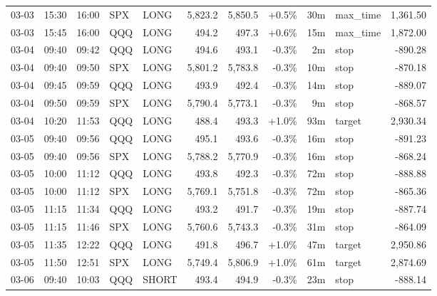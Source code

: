 \documentclass[11pt,a4paper,twoside]{article}
\begin{document}
\begin{center}
\begin{longtable}{>{\color{txtmain}}l l l l l r r r r >{\color{txtmain}}l r}
03-03 & 15:30 & 16:00 & SPX & LONG & 5,823.2 & 5,850.5 & \textcolor{wingreen}{+0.5\%} & 30m & max\_time & \textcolor{wingreen}{1,361.50} \\
03-03 & 15:45 & 16:00 & QQQ & LONG & 494.2 & 497.3 & \textcolor{wingreen}{+0.6\%} & 15m & max\_time & \textcolor{wingreen}{1,872.00} \\
03-04 & 09:40 & 09:42 & QQQ & LONG & 494.6 & 493.1 & \textcolor{lossred}{-0.3\%} & 2m & stop & \textcolor{lossred}{-890.28} \\
03-04 & 09:40 & 09:50 & SPX & LONG & 5,801.2 & 5,783.8 & \textcolor{lossred}{-0.3\%} & 10m & stop & \textcolor{lossred}{-870.18} \\
03-04 & 09:45 & 09:59 & QQQ & LONG & 493.9 & 492.4 & \textcolor{lossred}{-0.3\%} & 14m & stop & \textcolor{lossred}{-889.07} \\
03-04 & 09:50 & 09:59 & SPX & LONG & 5,790.4 & 5,773.1 & \textcolor{lossred}{-0.3\%} & 9m & stop & \textcolor{lossred}{-868.57} \\
03-04 & 10:20 & 11:53 & QQQ & LONG & 488.4 & 493.3 & \textcolor{wingreen}{+1.0\%} & 93m & target & \textcolor{wingreen}{2,930.34} \\
03-05 & 09:40 & 09:56 & QQQ & LONG & 495.1 & 493.6 & \textcolor{lossred}{-0.3\%} & 16m & stop & \textcolor{lossred}{-891.23} \\
03-05 & 09:40 & 09:56 & SPX & LONG & 5,788.2 & 5,770.9 & \textcolor{lossred}{-0.3\%} & 16m & stop & \textcolor{lossred}{-868.24} \\
03-05 & 10:00 & 11:12 & QQQ & LONG & 493.8 & 492.3 & \textcolor{lossred}{-0.3\%} & 72m & stop & \textcolor{lossred}{-888.88} \\
03-05 & 10:00 & 11:12 & SPX & LONG & 5,769.1 & 5,751.8 & \textcolor{lossred}{-0.3\%} & 72m & stop & \textcolor{lossred}{-865.36} \\
03-05 & 11:15 & 11:34 & QQQ & LONG & 493.2 & 491.7 & \textcolor{lossred}{-0.3\%} & 19m & stop & \textcolor{lossred}{-887.74} \\
03-05 & 11:15 & 11:46 & SPX & LONG & 5,760.6 & 5,743.3 & \textcolor{lossred}{-0.3\%} & 31m & stop & \textcolor{lossred}{-864.09} \\
03-05 & 11:35 & 12:22 & QQQ & LONG & 491.8 & 496.7 & \textcolor{wingreen}{+1.0\%} & 47m & target & \textcolor{wingreen}{2,950.86} \\
03-05 & 11:50 & 12:51 & SPX & LONG & 5,749.4 & 5,806.9 & \textcolor{wingreen}{+1.0\%} & 61m & target & \textcolor{wingreen}{2,874.69} \\
03-06 & 09:40 & 10:03 & QQQ & SHORT & 493.4 & 494.9 & \textcolor{lossred}{-0.3\%} & 23m & stop & \textcolor{lossred}{-888.14} \\

\end{longtable}
\end{center}
\end{document}

